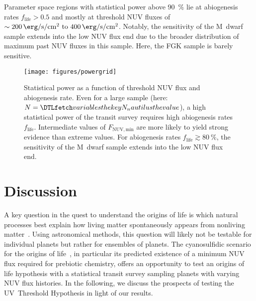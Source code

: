 \documentclass[twocolumn,twocolappendix,linenumbers]{aastex631}
\begin{document}
Parameter space regions with statistical power above \SI{90}{\percent} lie at abiogenesis rates $f_\mathrm{life} > 0.5$ and mostly at threshold \gls{NUV} fluxes of $\sim \SIrange{200}{400}{\erg\per\second\per\centi\meter\squared}$.
Notably, the sensitivity of the M~dwarf sample extends into the low \gls{NUV} flux end due to the broader distribution of maximum past \gls{NUV} fluxes in this sample.
Here, the FGK sample is barely sensitive.


\begin{figure*}
    \begin{centering}
        \texttt{[image: figures/powergrid]}
        \caption{Statistical power as a function of threshold \gls{NUV} flux and abiogenesis rate. Even for a large sample (here: $N=\var{N_nautilus}$), a high statistical power of the transit survey requires high abiogenesis rates $f_\mathrm{life}$.
         Intermediate values of $F_\mathrm{NUV, min}$ are more likely to yield strong evidence than extreme values. For abiogenesis rates $f_\mathrm{life} \gtrsim \SI{80}{\percent}$, the sensitivity of the M~dwarf sample extends into the low \gls{NUV} flux end.
         }
        \label{fig:powergrid}
    \end{centering}
\end{figure*}



\section{Discussion}
\label{sec:discussion}
A key question in the quest to understand the origins of life is which natural processes best explain how living matter spontaneously appears from nonliving matter~\citep[e.g.,][]{Malaterre2022}.
Using astronomical methods, this question will likely not be testable for individual planets but rather for ensembles of planets.
The cyanosulfidic scenario for the origins of life~\citep{Patel2015}, in particular its predicted existence of a minimum \gls{NUV} flux required for prebiotic chemistry, offers an opportunity to test an origins of life hypothesis with a statistical transit survey sampling planets with varying \gls{NUV} flux histories.
In the following, we discuss the prospects of testing the UV~Threshold Hypothesis in light of our results.
\end{document}
